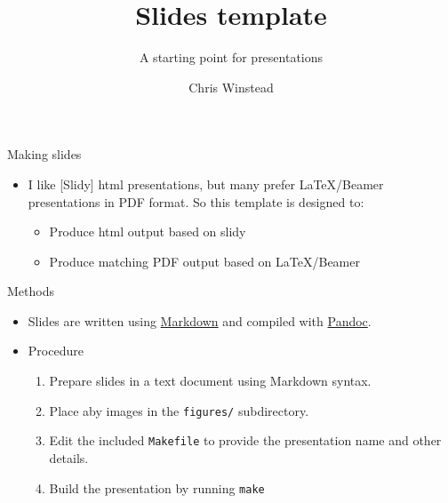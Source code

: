 \documentclass[ignorenonframetext,]{beamer}
\title{Slides template}
\subtitle{A starting point for presentations}
\author{Chris Winstead}
\date{}
\providecommand{\tightlist}{%
  \setlength{\itemsep}{0pt}\setlength{\parskip}{0pt}}
\begin{document}
\frame{\titlepage}

\begin{frame}{Making slides}
\protect\hypertarget{making-slides}{}
\begin{itemize}[<+->]
\item
  I like {[}Slidy{]} html presentations, but many prefer \LaTeX/Beamer
  presentations in PDF format. So this template is designed to:

  \begin{itemize}[<+->]
  \tightlist
  \item
    Produce html output based on slidy
  \item
    Produce matching PDF output based on \LaTeX/Beamer
  \end{itemize}
\end{itemize}
\end{frame}

\begin{frame}[fragile]{Methods}
\protect\hypertarget{methods}{}
\begin{itemize}[<+->]
\tightlist
\item
  Slides are written using \href{}{Markdown} and compiled with
  \href{}{Pandoc}.
\item
  Procedure

  \begin{enumerate}[<+->]
  \tightlist
  \item
    Prepare slides in a text document using Markdown syntax.
  \item
    Place aby images in the \texttt{figures/} subdirectory.
  \item
    Edit the included \texttt{Makefile} to provide the presentation name
    and other details.
  \item
    Build the presentation by running \texttt{make}
  \end{enumerate}
\end{itemize}
\end{frame}
\end{document}
